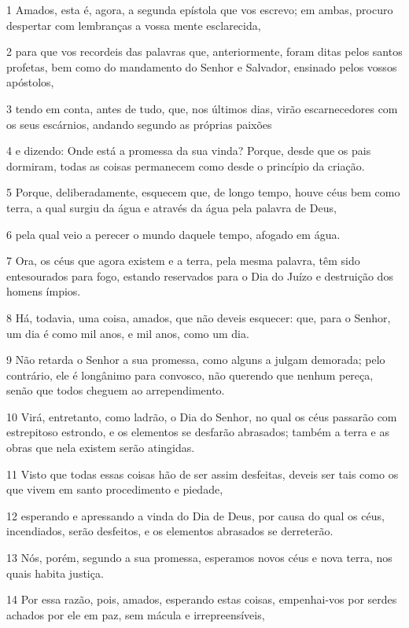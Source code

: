 \par 1 Amados, esta é, agora, a segunda epístola que vos escrevo; em ambas, procuro despertar com lembranças a vossa mente esclarecida,
\par 2 para que vos recordeis das palavras que, anteriormente, foram ditas pelos santos profetas, bem como do mandamento do Senhor e Salvador, ensinado pelos vossos apóstolos,
\par 3 tendo em conta, antes de tudo, que, nos últimos dias, virão escarnecedores com os seus escárnios, andando segundo as próprias paixões
\par 4 e dizendo: Onde está a promessa da sua vinda? Porque, desde que os pais dormiram, todas as coisas permanecem como desde o princípio da criação.
\par 5 Porque, deliberadamente, esquecem que, de longo tempo, houve céus bem como terra, a qual surgiu da água e através da água pela palavra de Deus,
\par 6 pela qual veio a perecer o mundo daquele tempo, afogado em água.
\par 7 Ora, os céus que agora existem e a terra, pela mesma palavra, têm sido entesourados para fogo, estando reservados para o Dia do Juízo e destruição dos homens ímpios.
\par 8 Há, todavia, uma coisa, amados, que não deveis esquecer: que, para o Senhor, um dia é como mil anos, e mil anos, como um dia.
\par 9 Não retarda o Senhor a sua promessa, como alguns a julgam demorada; pelo contrário, ele é longânimo para convosco, não querendo que nenhum pereça, senão que todos cheguem ao arrependimento.
\par 10 Virá, entretanto, como ladrão, o Dia do Senhor, no qual os céus passarão com estrepitoso estrondo, e os elementos se desfarão abrasados; também a terra e as obras que nela existem serão atingidas.
\par 11 Visto que todas essas coisas hão de ser assim desfeitas, deveis ser tais como os que vivem em santo procedimento e piedade,
\par 12 esperando e apressando a vinda do Dia de Deus, por causa do qual os céus, incendiados, serão desfeitos, e os elementos abrasados se derreterão.
\par 13 Nós, porém, segundo a sua promessa, esperamos novos céus e nova terra, nos quais habita justiça.
\par 14 Por essa razão, pois, amados, esperando estas coisas, empenhai-vos por serdes achados por ele em paz, sem mácula e irrepreensíveis,
